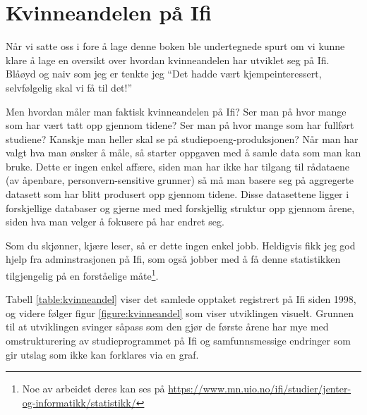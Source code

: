 \chapter{Kvinneandelen på Ifi}

\author{Skrevet av Arne Hassel, med god hjelp fra administrasjonen på Ifi ved Eli Berge}

Når vi satte oss i fore å lage denne boken ble undertegnede spurt om vi kunne klare å lage en oversikt over hvordan kvinneandelen har utviklet seg på Ifi. Blåøyd og naiv som jeg er tenkte jeg ``Det hadde vært kjempeinteressert, selvfølgelig skal vi få til det!'' 

Men hvordan måler man faktisk kvinneandelen på Ifi? Ser man på hvor mange som har vært tatt opp gjennom tidene? Ser man på hvor mange som har fullført studiene? Kanskje man heller skal se på studiepoeng-produksjonen? Når man har valgt hva man ønsker å måle, så starter oppgaven med å samle data som man kan bruke. Dette er ingen enkel affære, siden man har ikke har tilgang til rådataene (av åpenbare, personvern-sensitive grunner) så må man basere seg på aggregerte datasett som har blitt produsert opp gjennom tidene. Disse datasettene ligger i forskjellige databaser og gjerne med med forskjellig struktur opp gjennom årene, siden hva man velger å fokusere på har endret seg.

Som du skjønner, kjære leser, så er dette ingen enkel jobb. Heldigvis fikk jeg god hjelp fra adminstrasjonen på Ifi, som også jobber med å få denne statistikken tilgjengelig på en forståelige måte\footnote{Noe av arbeidet deres kan ses på \url{https://www.mn.uio.no/ifi/studier/jenter-og-informatikk/statistikk/}}.

Tabell \ref{table:kvinneandel} viser det samlede opptaket registrert på Ifi siden 1998, og videre følger figur \ref{figure:kvinneandel} som viser utviklingen visuelt. Grunnen til at utviklingen svinger såpass som den gjør de første årene har mye med omstrukturering av studieprogrammet på Ifi og samfunnsmessige endringer som gir utslag som ikke kan forklares via en graf.

